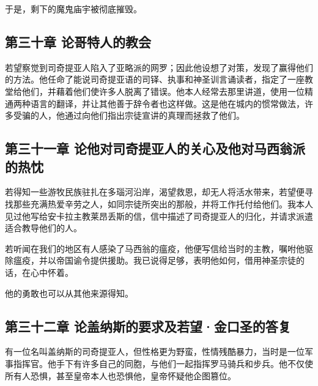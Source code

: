 于是，剩下的魔鬼庙宇被彻底摧毁。\par


\subsection{第三十章 论哥特人的教会}

若望察觉到司奇提亚人陷入了亚略派的网罗；因此他设想了对策，发现了赢得他们的方法。他任命了能说司奇提亚语的司铎、执事和神圣训言诵读者，指定了一座教堂给他们，并藉着他们使许多人脱离了错误。他本人经常去那里讲道，使用一位精通两种语言的翻译，并让其他善于辞令者也这样做。这是他在城内的惯常做法，许多受骗的人，他通过向他们指出宗徒宣讲的真理而拯救了他们。\par


\subsection{第三十一章 论他对司奇提亚人的关心及他对马西翁派的热忱}

若得知一些游牧民族驻扎在多瑙河沿岸，渴望救恩，却无人将活水带来，若望便寻找那些充满热爱辛劳之人，如同宗徒所突出的那般，并将工作托付给他们。我本人见过他写给安卡拉主教莱昂丢斯的信，信中描述了司奇提亚人的归化，并请求派遣适合教导他们的人。\par

若听闻在我们的地区有人感染了马西翁的瘟疫，他便写信给当时的主教，嘱咐他驱除瘟疫，并以帝国谕令提供援助。我已说得足够，表明他如何，借用神圣宗徒的话，在心中怀着。\par

他的勇敢也可以从其他来源得知。\par


\subsection{第三十二章 论盖纳斯的要求及若望·金口圣的答复}

有一位名叫盖纳斯的司奇提亚人，但性格更为野蛮，性情残酷暴力，当时是一位军事指挥官。他手下有许多自己的同胞，与他们一起指挥罗马骑兵和步兵。他不仅使所有人恐惧，甚至皇帝本人也恐惧他，皇帝怀疑他企图篡位。\par

